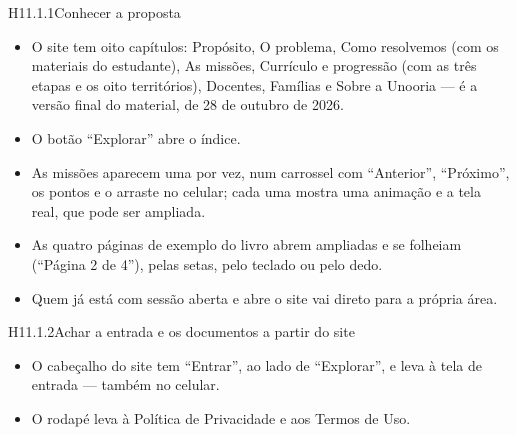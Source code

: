 \begin{historia}{H11.1.1}{Conhecer a proposta}{\pronto}
\aceite
\begin{itemize}
  \item O site tem oito capítulos: Propósito, O problema, Como resolvemos
    (com os materiais do estudante), As missões, Currículo e progressão
    (com as três etapas e os oito territórios), Docentes, Famílias e Sobre a
    Unooria --- é a versão final do material, de 28 de outubro de 2026.
  \item O botão \enquote{Explorar} abre o índice.
  \item As missões aparecem uma por vez, num carrossel com
    \enquote{Anterior}, \enquote{Próximo}, os pontos e o arraste no celular;
    cada uma mostra uma animação e a tela real, que pode ser ampliada.
  \item As quatro páginas de exemplo do livro abrem ampliadas e se folheiam
    (\enquote{Página 2 de 4}), pelas setas, pelo teclado ou pelo dedo.
  \item Quem já está com sessão aberta e abre o site vai direto para a própria
    área.
\end{itemize}
\end{historia}

\begin{historia}{H11.1.2}{Achar a entrada e os documentos a partir do site}{\pronto}
\aceite
\begin{itemize}
  \item O cabeçalho do site tem \enquote{Entrar}, ao lado de
    \enquote{Explorar}, e leva à tela de entrada --- também no celular.
  \item O rodapé leva à Política de Privacidade e aos Termos de Uso.
\end{itemize}
\end{historia}


